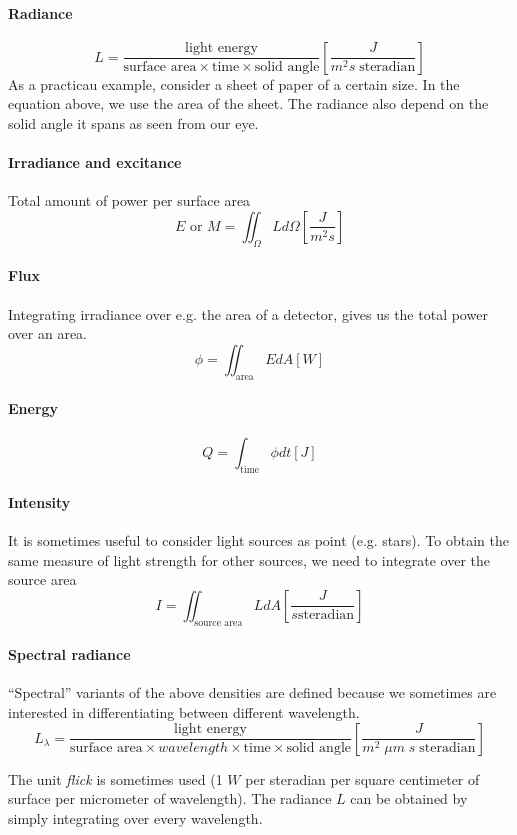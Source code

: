 \documentclass[article]{memoir}
\newcommand{\unit}[1]{\left[#1\right]}
\begin{document}
\paragraph{Radiance}
\[
L = \frac{\text{light energy}}{\text{surface area} \times \text{time} \times \text{solid angle}} \left[\frac{J}{m^2 s\; \text{steradian}}\right]
\]
As a practicau example, consider a sheet of paper of a certain size. In the equation above, we use the area of the sheet. The radiance also depend on the solid angle it spans as seen from our eye.

\paragraph{Irradiance and excitance}
Total amount of power per surface area
\[
    E\text{ or } M = \iint_\Omega L d\Omega \left[\frac{J}{m^2 s}\right]
\]
\paragraph{Flux}
Integrating irradiance over e.g. the area of a detector, gives us the total power over an area.
\[
    \phi = \iint_\text{area} E dA \left[W\right]
\]
\paragraph{Energy}
\[
    Q = \int_\text{time} \phi dt [J]
\]

\paragraph{Intensity}
It is sometimes useful to consider light sources as point (e.g. stars). To obtain the same measure of light strength for other sources, we need to integrate over the source area 
\[
    I = \iint_{\text{source area}} L dA \unit{\frac{J}{s \text{steradian}}}
\]

\paragraph{Spectral radiance}
``Spectral'' variants of the above densities are defined because we sometimes are interested in differentiating between different wavelength.
\[
    L_{\lambda} = \frac{\text{light energy}}{\text{surface area} \times wavelength \times \text{time} \times \text{solid angle}} \left[\frac{J}{m^2 \;\mu m \; s\; \text{steradian}}\right]
\]

The unit \emph{flick} is sometimes used (1 \(W\) per steradian per square centimeter of surface per micrometer of wavelength). The radiance \(L\) can be obtained by simply integrating over every wavelength.
\end{document}
